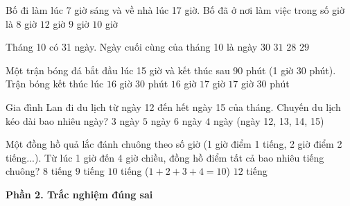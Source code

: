 \begin{ex} %
Bố đi làm lúc 7 giờ sáng và về nhà lúc 17 giờ. Bố đã ở nơi làm việc trong số giờ là
\choice
{$8$ giờ}
{$12$ giờ}
{$9$ giờ}
{\True $10$ giờ}
\end{ex}

\begin{ex} %
Tháng 10 có 31 ngày. Ngày cuối cùng của tháng 10 là ngày
\choice
{$30$}
{\True $31$}
{$28$}
{$29$}
\end{ex}

\begin{ex} %
Một trận bóng đá bắt đầu lúc 15 giờ và kết thúc sau 90 phút (1 giờ 30 phút). Trận bóng kết thúc lúc
\choice
{\True $16$ giờ $30$ phút}
{$16$ giờ}
{$17$ giờ}
{$17$ giờ $30$ phút}
\end{ex}

\begin{ex} %
Gia đình Lan đi du lịch từ ngày 12 đến hết ngày 15 của tháng. Chuyến du lịch kéo dài bao nhiêu ngày?
\choice
{$3$ ngày}
{$5$ ngày}
{$6$ ngày}
{\True $4$ ngày (ngày 12, 13, 14, 15)}
\end{ex}

\begin{ex} %
Một đồng hồ quả lắc đánh chuông theo số giờ (1 giờ điểm 1 tiếng, 2 giờ điểm 2 tiếng...). Từ lúc 1 giờ đến 4 giờ chiều, đồng hồ điểm tất cả bao nhiêu tiếng chuông?
\choice
{$8$ tiếng}
{$9$ tiếng}
{\True $10$ tiếng ($1 + 2 + 3 + 4 = 10$)}
{$12$ tiếng}
\end{ex}

\textbf{Phần 2. Trắc nghiệm đúng sai}

